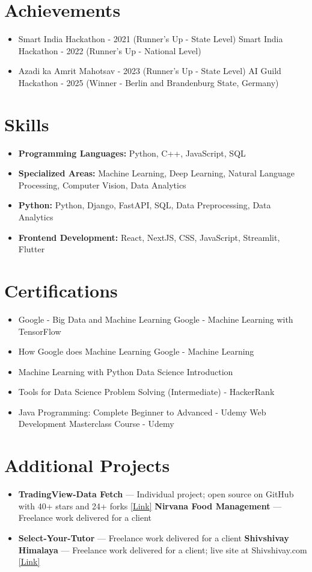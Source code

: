 \documentclass[a4paper,10pt]{article}
\begin{document}
\section*{Achievements}
\begin{itemize}
\item Smart India Hackathon - 2021 (Runner's Up - State Level) \hfill Smart India Hackathon - 2022 (Runner's Up - National Level)
\item Azadi ka Amrit Mahotsav - 2023 (Runner's Up - State Level) \hfill AI Guild Hackathon - 2025 (Winner - Berlin and Brandenburg State, Germany)
\end{itemize}

\section*{Skills}
\begin{itemize}
  \item \textbf{Programming Languages:} Python, C++, JavaScript, SQL
  \item \textbf{Specialized Areas:} Machine Learning, Deep Learning, Natural Language Processing, Computer Vision, Data Analytics
  \item \textbf{Python:} Python, Django, FastAPI, SQL, Data Preprocessing, Data Analytics
  \item \textbf{Frontend Development:} React, NextJS, CSS, JavaScript, Streamlit, Flutter
\end{itemize}

\section*{Certifications}
\begin{itemize}
\item Google - Big Data and Machine Learning \hfill Google - Machine Learning with TensorFlow
\item How Google does Machine Learning \hfill Google - Machine Learning
\item Machine Learning with Python \hfill Data Science Introduction
\item Tools for Data Science \hfill Problem Solving (Intermediate) - HackerRank
\item Java Programming: Complete Beginner to Advanced - Udemy \hfill Web Development Masterclass Course - Udemy
\end{itemize}

\section*{Additional Projects}
\begin{itemize}
\item \textbf{TradingView-Data Fetch} — Individual project; open source on GitHub with 40+ stars and 24+ forks \href{https://github.com/ravalmeet/TradingView}{[Link]} \hfill \textbf{Nirvana Food Management} — Freelance work delivered for a client
\item \textbf{Select-Your-Tutor} — Freelance work delivered for a client \hfill \textbf{Shivshivay Himalaya} — Freelance work delivered for a client; live site at Shivshivay.com \href{Shivshivay.com}{[Link]}
\end{itemize}
\end{document}
